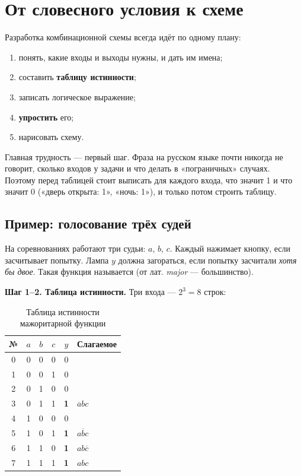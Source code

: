 \section{От словесного условия к схеме}

Разработка комбинационной схемы всегда идёт по одному плану:
\begin{enumerate}
  \item понять, какие входы и выходы нужны, и дать им имена;
  \item составить \textbf{таблицу истинности};
  \item записать логическое выражение;
  \item \textbf{упростить} его;
  \item нарисовать схему.
\end{enumerate}

Главная трудность --- первый шаг. Фраза на русском языке почти никогда не
говорит, сколько входов у задачи и что делать в «пограничных» случаях.
Поэтому перед таблицей стоит выписать для каждого входа, что значит 1 и что
значит 0 («дверь открыта: 1», «ночь: 1»), и только потом строить таблицу.

\subsection{Пример: голосование трёх судей}

На соревнованиях работают три судьи: $a$, $b$, $c$. Каждый нажимает кнопку,
если засчитывает попытку. Лампа $y$ должна загораться, если попытку
засчитали \emph{хотя бы двое}. Такая функция называется
 (от лат. \emph{major} --- большинство).

\textbf{Шаг 1--2. Таблица истинности.} Три входа --- $2^3 = 8$ строк:

\begin{table}[H]
\centering
\caption{Таблица истинности мажоритарной функции}
\label{tab:maj}
\begin{tabular}{c|ccc|c|l}
\toprule
\textbf{№} & $a$ & $b$ & $c$ & $y$ & \textbf{Слагаемое} \\
\midrule
0 & 0 & 0 & 0 & 0 & \\
1 & 0 & 0 & 1 & 0 & \\
2 & 0 & 1 & 0 & 0 & \\
3 & 0 & 1 & 1 & \textbf{1} & $\overline{a}bc$ \\
4 & 1 & 0 & 0 & 0 & \\
5 & 1 & 0 & 1 & \textbf{1} & $a\overline{b}c$ \\
6 & 1 & 1 & 0 & \textbf{1} & $ab\overline{c}$ \\
7 & 1 & 1 & 1 & \textbf{1} & $abc$ \\
\bottomrule
\end{tabular}
\end{table}

